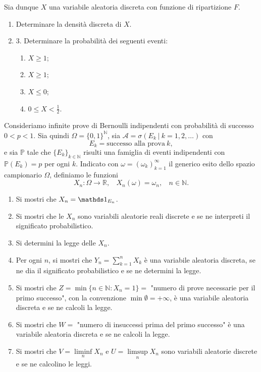 Sia dunque $X$ una variabile aleatoria discreta con funzione di ripartizione $F$.
\begin{enumerate}
\item Determinare la densità discreta di $X$.
\item 3. Determinare la probabilità dei seguenti eventi:
\begin{enumerate}
\item $X\geq 1$;
\item $X\geq 1$;
\item $X\leq 0$;
\item $0\leq X< \frac{1}{2}$.
\end{enumerate}
\end{enumerate}

Consideriamo infinite prove di Bernoulli indipendenti con probabilità di successo $0< p< 1$. Sia quindi $\Omega =\{0,1\}^{\mathbb{N}}$, sia $\mathcal{A} =\sigma ( E_{k} \ |\ k=1,2,\dotsc )$ con
\begin{equation*}
E_{k} =\text{successo alla prova} \ k,
\end{equation*}
e sia $\mathbb{P}$ tale che $\{E_{k}\}_{k\in \mathbb{N}}$ risulti una famiglia di eventi indipendenti con $\mathbb{P}( E_{k}) =p$ per ogni $k$. Indicato con $\omega =( \omega _{k})_{k=1}^{\infty }$ il generico esito dello spazio campionario $\Omega $, definiamo le funzioni
\begin{equation*}
X_{n} :\Omega \rightarrow \mathbb{R} ,\ \ \ \ X_{n}( \omega ) =\omega _{n} ,\ \ \ \ n\in \mathbb{N} .
\end{equation*}
\begin{enumerate}
\item Si mostri che $X_{n} =\Ind_{E_{n}}$.
\item Si mostri che le $X_{n}$ sono variabili aleatorie reali discrete e se ne interpreti il significato probabilistico.
\item Si determini la legge delle $X_{n}$.
\item Per ogni $n$, si mostri che $Y_{n} =\sum\nolimits _{k=1}^{n} X_{k}$ è una variabile aleatoria discreta, se ne dia il significato probabilistico e se ne determini la legge.
\item Si mostri che $Z=\min\{n\in \mathbb{N} :X_{n} =1\} =$ "numero di prove necessarie per il primo successo", con la convenzione $\min \emptyset =+\infty $, è una variabile aleatoria discreta e se ne calcoli la legge.
\item Si mostri che $W=$ "numero di insuccessi prima del primo successo" è una variabile aleatoria discreta e se ne calcoli la legge.
\item Si mostri che $V=\liminf\limits _{n} X_{n}$ e $U=\limsup\limits _{n} X_{n}$ sono variabili aleatorie discrete e se ne calcolino le leggi.
\end{enumerate}

